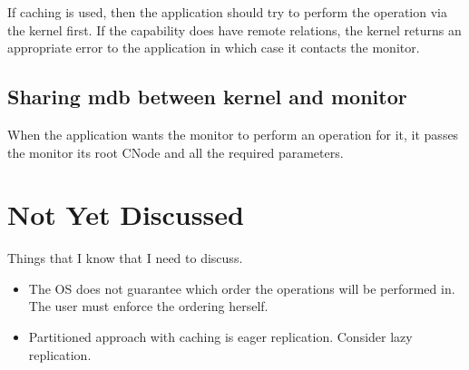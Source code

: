 \documentclass[a4paper,twoside]{report} %
\begin{document}
If caching is used, then the application should try to perform the
operation via the kernel first. If the capability does have remote
relations, the kernel returns an appropriate error to the application
in which case it contacts the monitor.

\section{Sharing mdb between kernel and monitor}
When the application wants the monitor to perform an operation for it,
it passes the monitor its root CNode and all the required parameters.


\chapter{Not Yet Discussed}\label{chap:nyd}

Things that I know that I need to discuss.

\begin{itemize}

\item The OS does not guarantee which order the operations will be
  performed in. The user must enforce the ordering herself.

\item Partitioned approach with caching is eager replication. Consider
  lazy replication.
\end{itemize}



\end{document}
